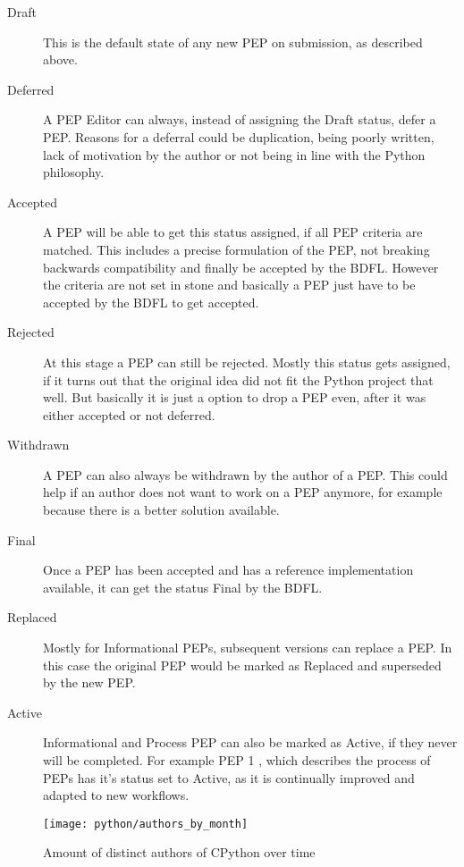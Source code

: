 \begin{description}

  \item[Draft] This is the default state of any new \ac{PEP} on submission, as
    described above.

  \item[Deferred] A \ac{PEP} Editor can always, instead of assigning the Draft
    status, defer a \ac{PEP}. Reasons for a deferral could be duplication,
    being poorly written, lack of motivation by the author or not being in line
    with the Python philosophy.

  \item[Accepted] A \ac{PEP} will be able to get this status assigned, if all
    \ac{PEP} criteria are matched. This includes a precise formulation of the
    \ac{PEP}, not breaking backwards compatibility and finally be accepted by
    the \ac{BDFL}. However the criteria are not set in stone and basically a
    \ac{PEP} just have to be accepted by the \ac{BDFL} to get accepted.

  \item[Rejected] At this stage a \ac{PEP} can still be rejected. Mostly this
    status gets assigned, if it turns out that the original idea did not fit
    the Python project that well. But basically it is just a option to drop a
    \ac{PEP} even, after it was either accepted or not deferred.

  \item[Withdrawn] A \ac{PEP} can also always be withdrawn by the author of a
    \ac{PEP}. This could help if an author does not want to work on a \ac{PEP}
    anymore, for example because there is a better solution available.

  \item[Final] Once a \ac{PEP} has been accepted and has a reference implementation
    available, it can get the status Final by the \ac{BDFL}.

  \item[Replaced] Mostly for Informational \acp{PEP}, subsequent versions can
    replace a \ac{PEP}. In this case the original \ac{PEP} would be marked as
    Replaced and superseded by the new \ac{PEP}.

  \item[Active] Informational and Process \ac{PEP} can also be marked as Active, if
    they never will be completed. For example \ac{PEP} 1 \cite{Warsaw2000}, which
    describes the process of \acp{PEP} has it's status set to Active, as it is
    continually improved and adapted to new workflows.

\end{description}

\begin{figure}[htbp]
  \centering
  \texttt{[image: python/authors\_by\_month]}
  \caption{Amount of distinct authors of CPython over time}
\end{figure}


